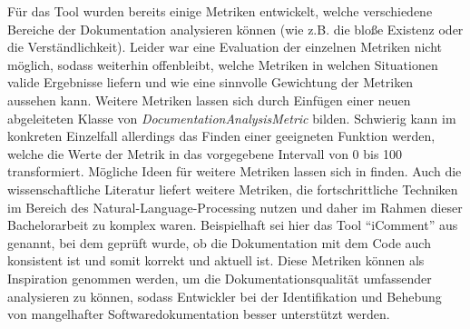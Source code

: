 Für das Tool wurden bereits einige Metriken entwickelt, welche verschiedene Bereiche der Dokumentation analysieren können (wie z.B. die bloße Existenz oder die Verständlichkeit). Leider war eine Evaluation der einzelnen Metriken nicht möglich, sodass weiterhin offenbleibt, welche Metriken in welchen Situationen valide Ergebnisse liefern und wie eine sinnvolle Gewichtung der Metriken aussehen kann.  Weitere Metriken lassen sich durch Einfügen einer neuen abgeleiteten Klasse von \textit{DocumentationAnalysisMetric} bilden. Schwierig kann im konkreten Einzelfall allerdings das Finden einer geeigneten Funktion werden, welche die Werte der Metrik in das vorgegebene Intervall von 0 bis 100 transformiert. Mögliche Ideen für weitere Metriken lassen sich in \cite{checkstyle_doc_metrics} finden. Auch die wissenschaftliche Literatur liefert weitere Metriken, die fortschrittliche Techniken im Bereich des Natural-Language-Processing nutzen und daher im Rahmen dieser Bachelorarbeit zu komplex waren. Beispielhaft sei hier das Tool \enquote{iComment} aus  \cite[S.~145ff.]{icomment} genannt, bei dem geprüft wurde, ob die Dokumentation mit dem Code auch konsistent ist und somit korrekt und aktuell ist. Diese Metriken können als Inspiration genommen werden, um die Dokumentationsqualität umfassender analysieren zu können, sodass Entwickler bei der Identifikation und Behebung von mangelhafter Softwaredokumentation  besser unterstützt werden.



